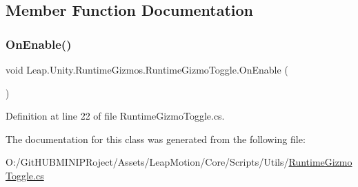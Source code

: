 \subsection{Member Function Documentation}
\mbox{\label{class_leap_1_1_unity_1_1_runtime_gizmos_1_1_runtime_gizmo_toggle_acf13404190ac5eea4ded66cedc734bc9}} 
\subsubsection{\texorpdfstring{OnEnable()}{OnEnable()}}
{\footnotesize\ttfamily void Leap.\+Unity.\+Runtime\+Gizmos.\+Runtime\+Gizmo\+Toggle.\+On\+Enable (\begin{DoxyParamCaption}{ }\end{DoxyParamCaption})}



Definition at line 22 of file Runtime\+Gizmo\+Toggle.\+cs.



The documentation for this class was generated from the following file\+:\begin{DoxyCompactItemize}
\item 
O\+:/\+Git\+H\+U\+B\+M\+I\+N\+I\+P\+Roject/\+Assets/\+Leap\+Motion/\+Core/\+Scripts/\+Utils/\mbox{\hyperlink{_runtime_gizmo_toggle_8cs}{Runtime\+Gizmo\+Toggle.\+cs}}\end{DoxyCompactItemize}
